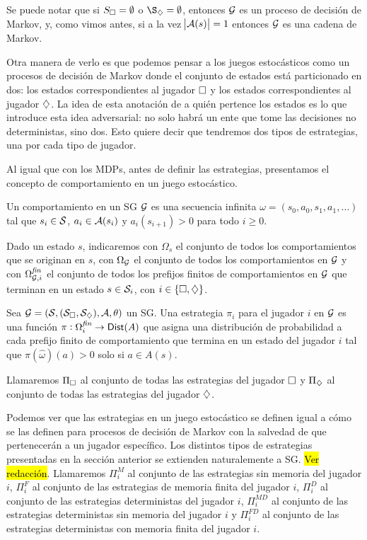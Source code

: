 Se puede notar que si $S_\square = \emptyset$ o $\S_\diam = \emptyset$, entonces
$\mathcal{G}$ es un proceso de decisión de Markov, y, como vimos antes, si a la vez
$\abs{\mathcal{A}(s)} = 1$ entonces $\mathcal{G}$ es una cadena de Markov.

Otra manera de verlo es que podemos pensar a los juegos estocásticos como un
procesos de decisión de Markov donde el conjunto de estados está particionado
en dos: los estados correspondientes al jugador $\square$ y los estados
correspondientes al jugador $\diamondsuit$. La idea de esta anotación de a quién
pertence los estados es lo que introduce esta idea adversarial: no solo habrá
un ente que tome las decisiones no deterministas, sino dos. Esto quiere decir
que tendremos dos tipos de estrategias, una por cada tipo de jugador.

Al igual que con los MDPs, antes de definir las estrategias, presentamos el
concepto de comportamiento en un juego estocástico.

\begin{definition}[Comportamiento en un SG]
	Un comportamiento en un SG $\mathcal{G}$ es una secuencia infinita $\omega = (s_0, a_0, s_1, a_1, \dots)$ tal que $s_i \in \mathcal{S}$, $a_i \in \mathcal{A}(s_i)$ y $a_i(s_{i+1}) > 0$ para todo $i \geq 0$.

	Dado un estado $s$, indicaremos con $\Omega_s$ el conjunto de todos los
	comportamientos que se originan en $s$, con $\Omega_{\mathcal{G}}$ el conjunto de todos
	los comportamientos en $\mathcal{G}$ y con $\Omega^{\textit{fin}}_{\mathcal{G}, i}$ el conjunto
	de todos los prefijos finitos de comportamientos en $\mathcal{G}$ que terminan en un
	estado $s \in \mathcal{S}_i$, con $i \in \{\square, \diamondsuit\}$.
\end{definition}

\begin{definition}
	Sea $\mathcal{G} = (\mathcal{S}, (\mathcal{S}_\square, \mathcal{S}_\diamondsuit), \mathcal{A}, \theta)$ un SG. Una estrategia $\pi_i$ para el jugador $i$ en $\mathcal{G}$ es una función $\pi: \Omega^{\textit{fin}}_i \rightarrow \mathsf{Dist} (A)$ que asigna una distribución de probabilidad a cada prefijo finito de comportamiento que termina en un estado del jugador $i$ tal que $\pi(\hat \omega) (a) > 0$ solo si $a \in A(s)$.

	Llamaremos $\Pi_\square$ al conjunto de todas las estrategias del jugador $\square$
	y $\Pi_\diamondsuit$ al conjunto de todas las estrategias del jugador $\diamondsuit$.
\end{definition}

Podemos ver que las estrategias en un juego estocástico se definen igual a cómo
se las definen para procesos de decisión de Markov con la salvedad de que
pertenecerán a un jugador específico. Los distintos tipos de estrategias
presentadas en la sección anterior se extienden naturalemente a SG. \hl{Ver
	redacción}. Llamaremos $\Pi^{M}_i$ al conjunto de las estrategias sin memoria
del jugador $i$, $\Pi^{F}_i$ al conjunto de las estrategias de memoria finita
del jugador $i$, $\Pi^{D}_i$ al conjunto de las estrategias deterministas del
jugador $i$, $\Pi^{MD}_i$ al conjunto de las estrategias deterministas sin
memoria del jugador $i$ y $\Pi^{FD}_i$ al conjunto de las estrategias
deterministas con memoria finita del jugador $i$.

